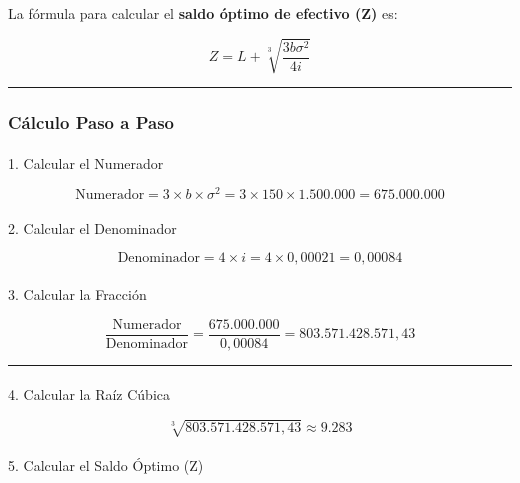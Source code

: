 \documentclass[
  letterpaper,
  DIV=11,
  numbers=noendperiod]{scrartcl}
\makeatletter
\let\oldparagraph\paragraph
\renewcommand{\paragraph}{
    \@ifstar
      \xxxParagraphStar
      \xxxParagraphNoStar
  }
\newcommand{\xxxParagraphStar}[1]{\oldparagraph*{#1}\mbox{}}
\newcommand{\xxxParagraphNoStar}[1]{\oldparagraph{#1}\mbox{}}
\makeatother
\begin{document}
La fórmula para calcular el \textbf{saldo óptimo de efectivo (Z)} es:

\[
Z = L + \sqrt[3]{\dfrac{3b\sigma^2}{4i}}
\]

\begin{center}\rule{0.5\linewidth}{0.5pt}\end{center}

\subsubsection{Cálculo Paso a Paso}\label{cuxe1lculo-paso-a-paso}

\paragraph{1. Calcular el Numerador}\label{calcular-el-numerador}

\[
\text{Numerador} = 3 \times b \times \sigma^2 = 3 \times 150 \times 1.500.000 = 675.000.000
\]

\paragraph{2. Calcular el Denominador}\label{calcular-el-denominador}

\[
\text{Denominador} = 4 \times i = 4 \times 0,00021 = 0,00084
\]

\paragraph{3. Calcular la Fracción}\label{calcular-la-fracciuxf3n}

\[
\frac{\text{Numerador}}{\text{Denominador}} = \frac{675.000.000}{0,00084} = 803.571.428.571,43
\]

\begin{center}\rule{0.5\linewidth}{0.5pt}\end{center}

\paragraph{4. Calcular la Raíz
Cúbica}\label{calcular-la-rauxedz-cuxfabica}

\[
\sqrt[3]{803.571.428.571,43} \approx 9.283
\]

\paragraph{5. Calcular el Saldo Óptimo
(Z)}\label{calcular-el-saldo-uxf3ptimo-z}
\end{document}
